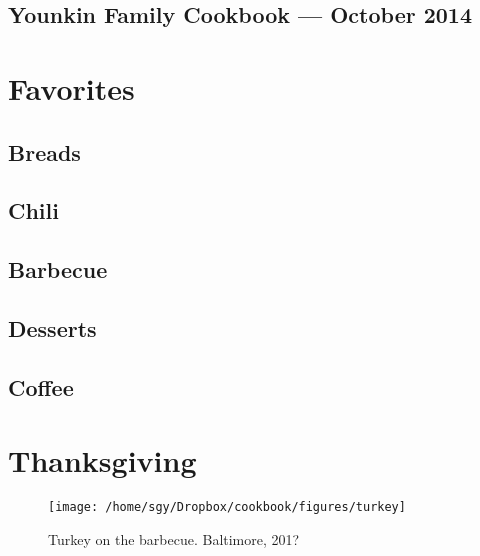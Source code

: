 \documentclass[12pt, final]{book}
\begin{document}
\frontmatter

\cleardoublepage
\section*{Younkin Family Cookbook --- October 2014}

\tableofcontents
\mainmatter

\chapter{Favorites}\label{chapter1}

\newpage

\newpage

\newpage

\newpage
\section{Breads}

\newpage

\newpage

\newpage
\section{Chili}

\newpage

\newpage

\newpage
\section{Barbecue}

\newpage

\newpage
\section{Desserts}

\newpage

\newpage

\newpage

\newpage
\section{Coffee}

\newpage

\clearpage
\chapter{Thanksgiving}\label{chapter2}
\begin{figure}[h]
\begin{center}
\texttt{[image: /home/sgy/Dropbox/cookbook/figures/turkey]}
\end{center}
\caption*{Turkey on the barbecue. Baltimore, 201?}
\end{figure}
\newpage


\newpage

\newpage

\newpage

\newpage

\newpage

\newpage

\newpage
\end{document}
